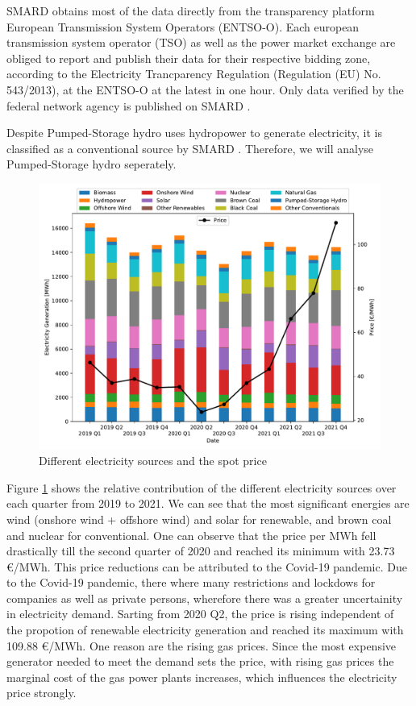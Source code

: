 \documentclass{article}
\begin{document}
SMARD obtains most of the data directly from the transparency platform European Transmission System Operators (ENTSO-O). 
Each european transmission system operator (TSO) as well as the power market exchange are obliged to report and publish their data for their respective bidding zone, according to the Electricity Trancparency Regulation (Regulation (EU) No. 543/2013), at the ENTSO-O at the latest in one hour.
Only data verified by the federal network agency is published on SMARD \citep{smard_usermanual}.

Despite Pumped-Storage hydro uses hydropower to generate electricity, it is classified as a conventional source by SMARD \citep{smard_usermanual}. Therefore, we will analyse Pumped-Storage hydro seperately.  

\begin{figure}[h]
    \centering
    \includegraphics[width=0.8\columnwidth]{doc/fig/quarterly_technology_mix_with_price.pdf}
    \caption{Different electricity sources and the spot price}
    \label{fig:quarterly_mix}
\end{figure}

Figure \ref{fig:quarterly_mix} shows the relative contribution of the different electricity sources over each quarter from 2019 to 2021. 
We can see that the most significant energies are wind (onshore wind + offshore wind) and solar for renewable, and brown coal and nuclear for conventional. 
One can observe that the price per MWh fell drastically till the second quarter of 2020 and reached its minimum with 23.73 €/MWh. 
This price reductions can be attributed to the Covid-19 pandemic. 
Due to the Covid-19 pandemic, there where many restrictions and lockdows for companies as well as private persons, wherefore there was a greater uncertainity in electricity demand. 
Sarting from 2020 Q2, the price is rising independent of the propotion of renewable electricity generation and reached its maximum with 109.88 €/MWh. 
One reason are the rising gas prices. Since the most expensive generator needed to meet the demand sets the price, with rising gas prices the marginal cost of the gas power plants increases, which influences the electricity price strongly. 
\end{document}
